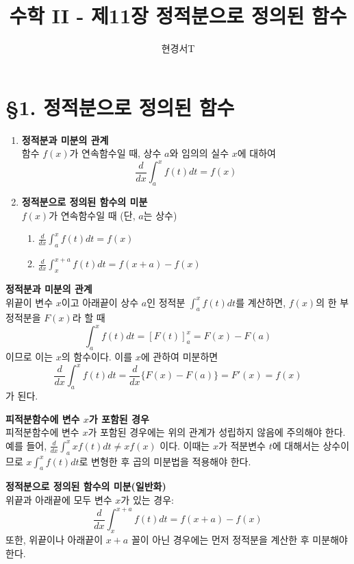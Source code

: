 \documentclass[a4paper,11pt]{article}
\title{\textbf{수학 II - 제11장 정적분으로 정의된 함수}}
\author{현경서T}
\date{}
\begin{document}
\maketitle

\section*{§1. 정적분으로 정의된 함수}

\begin{conceptbox}[기본 정석]
\begin{enumerate}
    \item \textbf{정적분과 미분의 관계} \\
    함수 $f(x)$가 연속함수일 때, 상수 $a$와 임의의 실수 $x$에 대하여
    \[ \frac{d}{dx} \int_{a}^{x} f(t) dt = f(x) \]
    \item \textbf{정적분으로 정의된 함수의 미분} \\
    $f(x)$가 연속함수일 때 (단, $a$는 상수)
    \begin{enumerate}
        \item $\displaystyle \frac{d}{dx} \int_{a}^{x} f(t) dt = f(x)$
        \item $\displaystyle \frac{d}{dx} \int_{x}^{x+a} f(t) dt = f(x+a) - f(x)$
    \end{enumerate}
\end{enumerate}
\end{conceptbox}

\begin{advicebox}
\textbf{정적분과 미분의 관계} \\
위끝이 변수 $x$이고 아래끝이 상수 $a$인 정적분 $\int_{a}^{x} f(t) dt$를 계산하면, $f(x)$의 한 부정적분을 $F(x)$라 할 때
\[ \int_{a}^{x} f(t) dt = [F(t)]_{a}^{x} = F(x) - F(a) \]
이므로 이는 $x$의 함수이다. 이를 $x$에 관하여 미분하면
\[ \frac{d}{dx} \int_{a}^{x} f(t) dt = \frac{d}{dx} \{ F(x) - F(a) \} = F'(x) = f(x) \]
가 된다. 
\end{advicebox}

\begin{advicebox}
\textbf{피적분함수에 변수 $x$가 포함된 경우}\\
피적분함수에 변수 $x$가 포함된 경우에는 위의 관계가 성립하지 않음에 주의해야 한다.
예를 들어, $\frac{d}{dx} \int_{a}^{x} xf(t) dt \ne xf(x)$ 이다. 이때는 $x$가 적분변수 $t$에 대해서는 상수이므로 $x \int_{a}^{x} f(t) dt$로 변형한 후 곱의 미분법을 적용해야 한다. 
\end{advicebox}

\begin{advicebox}
\textbf{정적분으로 정의된 함수의 미분(일반화)} \\
위끝과 아래끝에 모두 변수 $x$가 있는 경우:
\[ \frac{d}{dx} \int_{x}^{x+a} f(t) dt = f(x+a) - f(x) \]
또한, 위끝이나 아래끝이 $x+a$ 꼴이 아닌 경우에는 먼저 정적분을 계산한 후 미분해야 한다. 
\end{advicebox}
\end{document}
